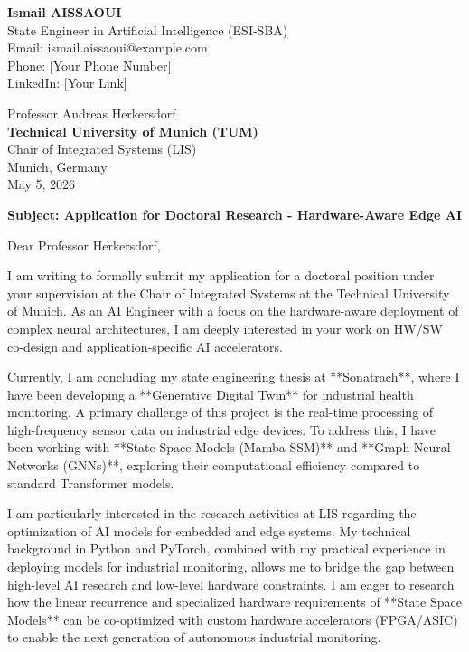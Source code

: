 \documentclass[11pt,a4paper]{article}
\begin{document}
\noindent \textbf{Ismail AISSAOUI} \\
State Engineer in Artificial Intelligence (ESI-SBA) \\
Email: ismail.aissaoui@example.com \\
Phone: [Your Phone Number] \\
LinkedIn: [Your Link]

\bigskip

\begin{flushright}
    Professor Andreas Herkersdorf \\
    \textbf{Technical University of Munich (TUM)} \\
    Chair of Integrated Systems (LIS) \\
    Munich, Germany \\
    \medskip
    May 5, 2026
\end{flushright}

\bigskip

\noindent \textbf{Subject: Application for Doctoral Research - Hardware-Aware Edge AI}

\bigskip

Dear Professor Herkersdorf,

I am writing to formally submit my application for a doctoral position under your supervision at the Chair of Integrated Systems at the Technical University of Munich. As an AI Engineer with a focus on the hardware-aware deployment of complex neural architectures, I am deeply interested in your work on HW/SW co-design and application-specific AI accelerators.

Currently, I am concluding my state engineering thesis at **Sonatrach**, where I have been developing a **Generative Digital Twin** for industrial health monitoring. A primary challenge of this project is the real-time processing of high-frequency sensor data on industrial edge devices. To address this, I have been working with **State Space Models (Mamba-SSM)** and **Graph Neural Networks (GNNs)**, exploring their computational efficiency compared to standard Transformer models.

I am particularly interested in the research activities at LIS regarding the optimization of AI models for embedded and edge systems. My technical background in Python and PyTorch, combined with my practical experience in deploying models for industrial monitoring, allows me to bridge the gap between high-level AI research and low-level hardware constraints. I am eager to research how the linear recurrence and specialized hardware requirements of **State Space Models** can be co-optimized with custom hardware accelerators (FPGA/ASIC) to enable the next generation of autonomous industrial monitoring.
\end{document}
